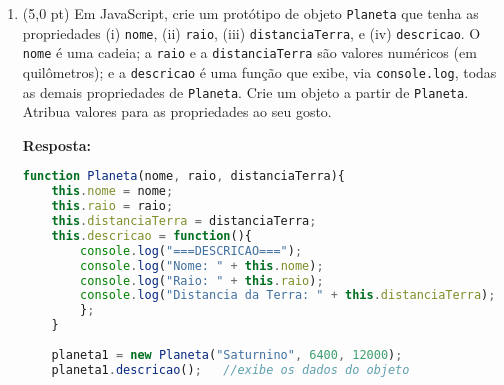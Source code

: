 \documentclass[12pt,a4paper,oneside]{article}
\begin{document}
\begin{enumerate}
\newpage 

	\item (5,0 pt) Em JavaScript, crie um protótipo de objeto {\tt Planeta} que tenha as propriedades (i) {\tt nome}, (ii) {\tt raio}, (iii) {\tt distanciaTerra}, e (iv) {\tt descricao}. O {\tt nome} é uma cadeia; a {\tt raio} e a {\tt distanciaTerra} são valores numéricos (em quilômetros); e a {\tt descricao} é uma função que exibe, via {\tt console.log}, todas as demais propriedades de {\tt Planeta}. Crie um objeto a partir de {\tt Planeta}. Atribua valores para as proprieda\-des ao seu gosto.
	
	\vspace{0.3cm}
	
	{\color{blue} {\bf Resposta:} }
	
	\begin{lstlisting}[language=JavaScript]
function Planeta(nome, raio, distanciaTerra){
	this.nome = nome;
	this.raio = raio;
	this.distanciaTerra = distanciaTerra;
	this.descricao = function(){
		console.log("===DESCRICAO===");
		console.log("Nome: " + this.nome);
		console.log("Raio: " + this.raio);
		console.log("Distancia da Terra: " + this.distanciaTerra);
		};
	}
	
	planeta1 = new Planeta("Saturnino", 6400, 12000);
	planeta1.descricao();	//exibe os dados do objeto
	\end{lstlisting}
	
	\end{enumerate}
\end{document}
